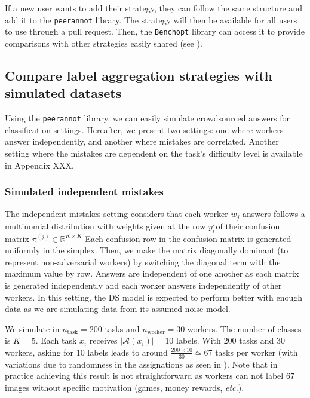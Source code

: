 If a new user wants to add their strategy, they can follow the same structure and add it to the \texttt{peerannot} library. The strategy will then be available for all users to use through a pull request.
Then, the \texttt{Benchopt} library can access it to provide comparisons with other strategies easily shared (see ).

\subsection{Compare label aggregation strategies with simulated datasets}
\label{subsec:simulated}

Using the \texttt{peerannot} library, we can easily simulate crowdsourced answers for classification settings.
Hereafter, we present two settings: one where workers answer independently, and another where mistakes are correlated.
Another setting where the mistakes are dependent on the task's difficulty level is available in Appendix XXX.

\subsubsection{Simulated independent mistakes}

The independent mistakes setting considers that each worker $w_j$ answers follows a multinomial distribution with weights given at the row $y_i^\star$​ of their confusion matrix $\pi^{(j)}\in\mathbb{R}^{K\times K}$ Each confusion row in the confusion matrix is generated uniformly in the simplex. Then, we make the matrix diagonally dominant (to represent non-adversarial workers) by switching the diagonal term with the maximum value by row. Answers are independent of one another as each matrix is generated independently and each worker answers independently of other workers. In this setting, the DS model is expected to perform better with enough data as we are simulating data from its assumed noise model.

We simulate in  $n_{\text{task}}=200$ tasks and $n_{\text{worker}}=30$ workers. The number of classes is $K=5$.
Each task $x_i$ receives $|\mathcal{A}(x_i)|=10$ labels. With $200$ tasks and $30$ workers, asking for $10$ labels leads to around $\frac{200\times 10}{30}\simeq 67$ tasks per worker (with variations due to randomness in the assignations as seen in ). Note that in practice achieving this result is not straightforward as workers can not label $67$ images without specific motivation (games, money rewards, \textit{etc.}).

